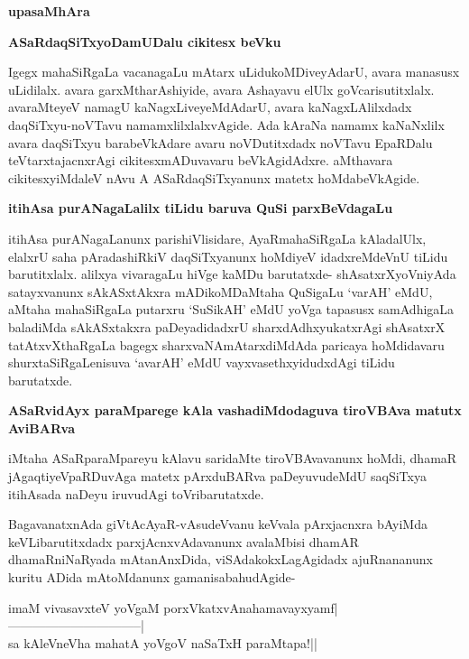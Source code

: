 \newpage

\begin{center}
{\Large{\textbf{upasaMhAra}}}
\end{center}
{
\noindent
{\large\bf ASaRdaqSiTxyoDamUDalu cikitesx beVku}}\label{page61}
\medskip

\noindent
Igegx mahaSiRgaLa vacanagaLu mAtarx uLidukoMDiveyAdarU, avara \hbox{manasusx} uLidilalx. avara garxMtha\-rAshiyide, avara Ashayavu elUlx goVcarisutitxlalx. ava\-raMteyeV namagU kaNagxLiveyeMdAdarU, avara kaNagxLAlilxdadx daqSiTxyu-noVTavu namamxlilxlalxvAgide. Ada kAraNa namamx kaNaNxlilx avara daqSiTxyu barabeVkAdare avaru noVDutitxdadx noVTavu EpaRDalu teVtarxtajacnxrAgi cikitesxmADuvavaru beVkAgidAdxre. aMthavara cikitesxyiMdaleV nAvu A ASaRdaqSiTxyanunx matetx hoMdabeVkAgide.

{\bigskip
\noindent
{\large\bf itihAsa purANagaLalilx tiLidu baruva QuSi parxBeVdagaLu}}\label{page62}
\medskip

\noindent
itihAsa purANagaLanunx parishiVlisidare, AyaRmahaSiRgaLa kAladalUlx, elalxrU saha pAra\-dashiRkiV daqSiTxyanunx hoMdiyeV idadxreMdeVnU tiLidu barutitxlalx. alilxya vivaragaLu hiVge kaMDu baru\-tatxde- shAsatxrXyoVniyAda satayxvanunx sAkASxtAkxra mADikoMDaMtaha QuSigaLu `varAH' eMdU, aMtaha maha\-SiRgaLa putarxru `SuSikAH' eMdU yoVga tapasusx samAdhigaLa baladiMda sAkASxtakxra paDeya\-didadxrU sharxdAdhx\-yukatxrAgi shAsatxrX tatAtxvXthaRgaLa bagegx sharxvaNAmAtarxdiMdAda paricaya hoMdidavaru shurxta\-SiR\-gaLenisuva `avarAH' eMdU vayxvasethxyidudxdAgi tiLidu barutatxde.

{\bigskip
\noindent
{\large\bf ASaRvidAyx paraMparege kAla vashadiMdodaguva tiroVBAva matutx AviBARva}}\label{page92}
\medskip

\noindent
iMtaha ASaRparaMpareyu kAlavu saridaMte tiroVBAvavanunx hoMdi, dhamaR jAgaqtiyeVpaRDu\-vAga matetx pArxduBARva paDeyuvudeMdU saqSiTxya itihAsada naDeyu iruvudAgi toVribarutatxde.

BagavanatxnAda giVtAcAyaR-vAsudeVvanu keVvala pArxjacnxra bAyiMda keVLibarutitxdadx parxjAcnxvAda\-vanunx avalaMbisi dhamAR dhamaRniNaRyada mAtanAnxDida, viSAda\-kokxLagAgidadx ajuRnananunx kuritu ADida mAtoMdanunx gamanisabahudAgide-

\begin{shloka}
imaM vivasavxteV yoVgaM porxVkatxvAnahamavayxyamf|\\\label{62}
--------------------------------|\\
sa kAleVneVha mahatA yoVgoV naSaTxH paraMtapa!|| 
\end{shloka}

